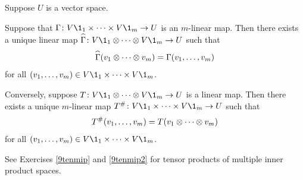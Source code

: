 {Suppose $U$ is a vector space.
\begin{subtheorem}
\item
Suppose that $\fun \Gamma {V\1_1 \times \cdots \times V\1_m} U$ is an $m$-linear map. Then there exists a unique linear map
$\fun {\hat[8]{\Gamma}} {V\1_1 \tensor \cdots \tensor V\1_m} U$ such that
\[
\hat[8]{\Gamma}(v_1 \tensor \cdots \tensor v_m) = \Gamma(v_1, \ldots, v_m)
\]
for all $(v_1, \ldots, v_m) \in V\1_1 \times \cdots \times V\1_m$.
\item
Conversely, suppose $\fun T {V\1_1 \tensor \cdots \tensor V\1_m} U$ is a linear map. Then there exists a unique $m$-linear map
$\fun {\pound{T}} {V\1_1 \times \cdots \times V\1_m} U$ such that
\[
{T}^{\#}(v_1, \ldots, v_m) = T(v_1 \otimes \cdots \otimes v_m)
\]
for all $(v_1, \ldots, v_m) \in V\1_1 \times \cdots \times V\1_m$.
\end{subtheorem}}

See Exercises \ref{9tenmip} and \ref{9tenmip2} for tensor products of multiple inner product spaces.

